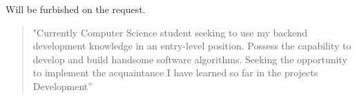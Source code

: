 \documentclass[10pt,a4paper,ragged2e,withhyper]{altacv}
\begin{document}
\begin{paracol}{2}
\divider

Will be furbished on the request.








\switchcolumn


\begin{quote}
"Currently Computer Science student seeking to use my backend 
development knowledge in an entry-level position. Possess the 
capability to develop and build handsome software algorithms. 
Seeking the opportunity to implement the acquaintance I have learned 
so far in the projects Development''
\end{quote}






\divider\smallskip



\\


\divider\smallskip


\divider\smallskip



\end{paracol}
\end{document}
